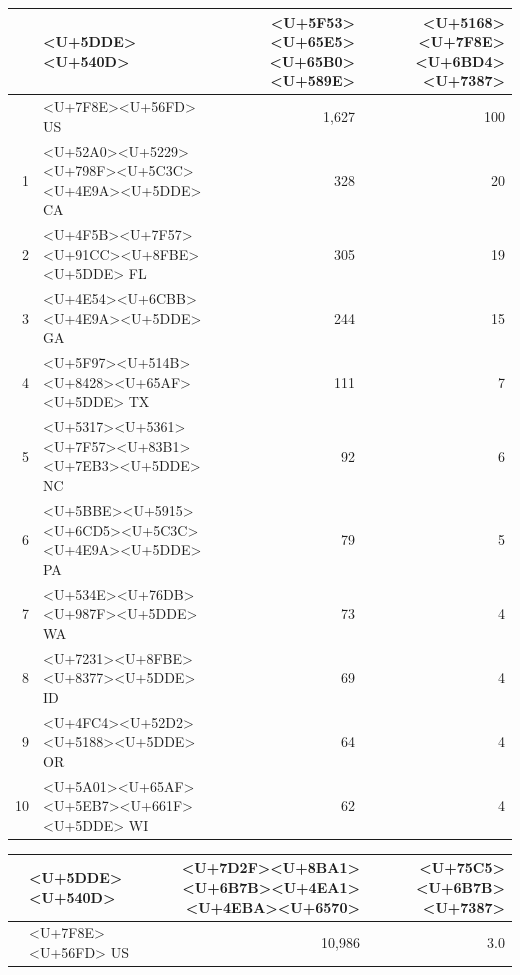 \documentclass[
]{article}
\begin{document}
\begin{table}
    \begin{minipage}{.4\linewidth}
    \caption{<U+786E><U+8BCA><U+524D><U+5341><U+4F4D><U+56FD><U+5BB6>}
    \vspace{-0.5\baselineskip}
      \centering
    \captionsetup{justification=centering} \begin{table}[H]
\centering
\begin{tabular}{rlrr}
\toprule
  & <U+5DDE><U+540D> & <U+5F53><U+65E5><U+65B0><U+589E> & <U+5168><U+7F8E><U+6BD4><U+7387>\\
\midrule
\rowcolor{gray!6}   & <U+7F8E><U+56FD> US & 1,627 & 100\\
1 & <U+52A0><U+5229><U+798F><U+5C3C><U+4E9A><U+5DDE> CA & 328 & 20\\
\rowcolor{gray!6}  2 & <U+4F5B><U+7F57><U+91CC><U+8FBE><U+5DDE> FL & 305 & 19\\
3 & <U+4E54><U+6CBB><U+4E9A><U+5DDE> GA & 244 & 15\\
\rowcolor{gray!6}  4 & <U+5F97><U+514B><U+8428><U+65AF><U+5DDE> TX & 111 & 7\\
5 & <U+5317><U+5361><U+7F57><U+83B1><U+7EB3><U+5DDE> NC & 92 & 6\\
\rowcolor{gray!6}  6 & <U+5BBE><U+5915><U+6CD5><U+5C3C><U+4E9A><U+5DDE> PA & 79 & 5\\
7 & <U+534E><U+76DB><U+987F><U+5DDE> WA & 73 & 4\\
\rowcolor{gray!6}  8 & <U+7231><U+8FBE><U+8377><U+5DDE> ID & 69 & 4\\
9 & <U+4FC4><U+52D2><U+5188><U+5DDE> OR & 64 & 4\\
\rowcolor{gray!6}  10 & <U+5A01><U+65AF><U+5EB7><U+661F><U+5DDE> WI & 62 & 4\\
\bottomrule
\end{tabular}
\end{table} \end{minipage}%
    \begin{minipage}{.7\linewidth}
     \caption{<U+7D2F><U+8BA1><U+6B7B><U+4EA1><U+524D><U+5341><U+4F4D><U+56FD><U+5BB6>}
     \vspace{-0.5\baselineskip}
      \centering
    \captionsetup{justification=centering} \begin{table}[H]
\centering
\begin{tabular}{rlrr}
\toprule
  & <U+5DDE><U+540D> & <U+7D2F><U+8BA1><U+6B7B><U+4EA1><U+4EBA><U+6570> & <U+75C5><U+6B7B><U+7387>\\
\midrule
\rowcolor{gray!6}   & <U+7F8E><U+56FD> US & 10,986 & 3.0\\

\end{tabular}
\end{table}
\end{minipage}
\end{table}
\end{document}

